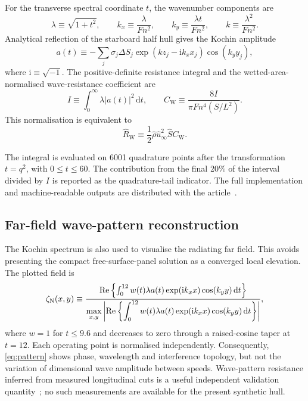 \documentclass{jfm}
\begin{document}
For the transverse spectral coordinate $t$, the wavenumber components are
\begin{equation}\label{eq:wavenumbers}
\lambda\equiv\sqrt{1+t^2},\qquad
k_x\equiv\frac{\lambda}{Fn^2},\qquad
k_y\equiv\frac{\lambda t}{Fn^2},\qquad
k\equiv\frac{\lambda^2}{Fn^2}.
\end{equation}
Analytical reflection of the starboard half hull gives the Kochin amplitude
\begin{equation}\label{eq:kochin_amplitude}
a(t)\equiv-\sum_j\sigma_j\Delta S_j
\exp\left(kz_j-\mathrm{i}k_xx_j\right)\cos(k_yy_j),
\end{equation}
where $\mathrm{i}\equiv\sqrt{-1}$. The positive-definite resistance integral
and the wetted-area-normalised wave-resistance coefficient are
\begin{equation}\label{eq:resistance_integral}
I\equiv\int_0^\infty\lambda|a(t)|^2\,\mathrm{d}t,
\qquad
C_\mathrm{W}\equiv\frac{8I}{\pi Fn^4(S/L^2)}.
\end{equation}
This normalisation is equivalent to
\begin{equation}\label{eq:dimensional_resistance}
\hat R_\mathrm{W}\equiv
\frac{1}{2}\hat\rho\hat u_\infty^2\hat S C_\mathrm{W}.
\end{equation}

The integral is evaluated on 6001 quadrature points after the transformation
$t=q^2$, with $0\leq t\leq60$. The contribution from the final 20\% of the
interval divided by $I$ is reported as the quadrature-tail indicator. The full
implementation and machine-readable outputs are distributed with the
article~\citep{Viola2026}.

\subsection{Far-field wave-pattern reconstruction}\label{subsec:wave_pattern}

The Kochin spectrum is also used to visualise the radiating far field. This
avoids presenting the compact free-surface-panel solution as a converged local
elevation. The plotted field is
\begin{equation}\label{eq:pattern}
\zeta_\mathrm{N}(x,y)\equiv
\frac{\mbox{Re}\left\{\int_0^{12}w(t)\lambda a(t)
\exp(\mathrm{i}k_xx)\cos(k_yy)\,\mathrm{d}t\right\}}
{\displaystyle\max_{x,y}\left|\mbox{Re}\left\{\int_0^{12}w(t)\lambda a(t)
\exp(\mathrm{i}k_xx)\cos(k_yy)\,\mathrm{d}t\right\}\right|},
\end{equation}
where $w=1$ for $t\leq9.6$ and decreases to zero through a raised-cosine taper
at $t=12$. Each operating point is normalised independently. Consequently,
\cref{eq:pattern} shows phase, wavelength and interference topology, but not
the variation of dimensional wave amplitude between speeds. Wave-pattern
resistance inferred from measured longitudinal cuts is a useful independent
validation quantity~\citep{ITTC2021}; no such measurements are available for
the present synthetic hull.
\end{document}

